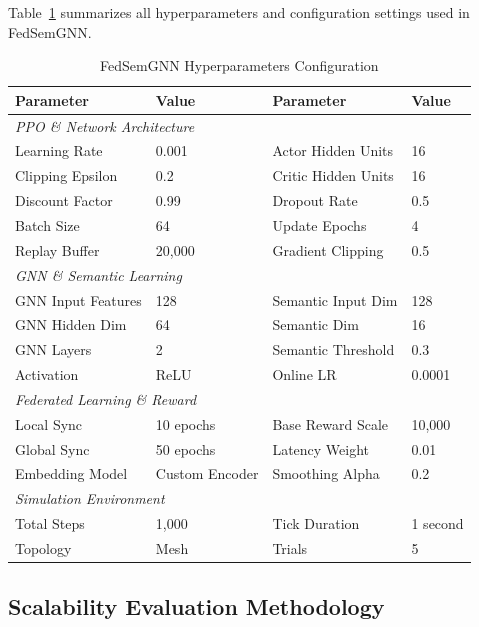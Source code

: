 \documentclass[conference]{IEEEtran}
\begin{document}
		Table~\ref{tab:hyperparameters} summarizes all hyperparameters and configuration settings used in FedSemGNN.
		
		\begin{table}[t]
			\centering
			\caption{FedSemGNN Hyperparameters Configuration}
			\label{tab:hyperparameters}
			\scriptsize
			\begin{tabular}{@{}llll@{}}
				\toprule
				\textbf{Parameter} & \textbf{Value} & \textbf{Parameter} & \textbf{Value} \\
				\midrule
				\multicolumn{4}{l}{\textit{PPO \& Network Architecture}} \\
				Learning Rate & 0.001 & Actor Hidden Units & 16 \\
				Clipping Epsilon & 0.2 & Critic Hidden Units & 16 \\
				Discount Factor & 0.99 & Dropout Rate & 0.5 \\
				Batch Size & 64 & Update Epochs & 4 \\
				Replay Buffer & 20,000 & Gradient Clipping & 0.5 \\
				\midrule
				\multicolumn{4}{l}{\textit{GNN \& Semantic Learning}} \\
				GNN Input Features & 128 & Semantic Input Dim & 128 \\
				GNN Hidden Dim & 64 & Semantic Dim & 16 \\
				GNN Layers & 2 & Semantic Threshold & 0.3 \\
				Activation & ReLU & Online LR & 0.0001 \\
				\midrule
				\multicolumn{4}{l}{\textit{Federated Learning \& Reward}} \\
				Local Sync & 10 epochs & Base Reward Scale & 10,000 \\
				Global Sync & 50 epochs & Latency Weight & 0.01 \\
				Embedding Model & Custom Encoder & Smoothing Alpha & 0.2 \\
				\midrule
				\multicolumn{4}{l}{\textit{Simulation Environment}} \\
				Total Steps & 1,000 & Tick Duration & 1 second \\
				Topology & Mesh & Trials & 5 \\
				\bottomrule
			\end{tabular}
		\end{table}
		
		\subsection{Scalability Evaluation Methodology}
		
\end{document}
